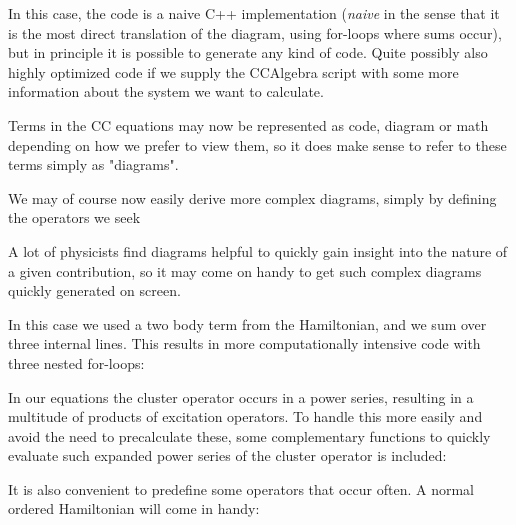 In this case, the code is a naive C++ implementation (\emph{naive} in the sense that it is the most direct translation of the diagram, using for-loops where sums occur), but in principle it is possible to generate any kind of code. Quite possibly also highly optimized code if we supply the CCAlgebra script with some more information about the system we want to calculate.

Terms in the CC equations may now be represented as code, diagram or math depending on how we prefer to view them, so it does make sense to refer to these terms simply as "diagrams".

We may of course now easily derive more complex diagrams, simply by defining the operators we seek

\begin{minipage}{\linewidth}
\end{minipage}

A lot of physicists find diagrams helpful to quickly gain insight into the nature of a given contribution, so it may come on handy to get such complex diagrams quickly generated on screen.

\begin{minipage}{\linewidth}
\end{minipage}

In this case we used a two body term from the Hamiltonian, and we sum over three internal lines. This results in more computationally intensive code with three nested for-loops:

\begin{minipage}{\linewidth}
\end{minipage}

In our equations the cluster operator occurs in a power series, resulting in a multitude of products of excitation operators. To handle this more easily and avoid the need to precalculate these, some complementary functions to quickly evaluate such expanded power series of the cluster operator is included:

\begin{minipage}{\linewidth}
\end{minipage}

It is also convenient to predefine some operators that occur often. A normal ordered Hamiltonian will come in handy:

